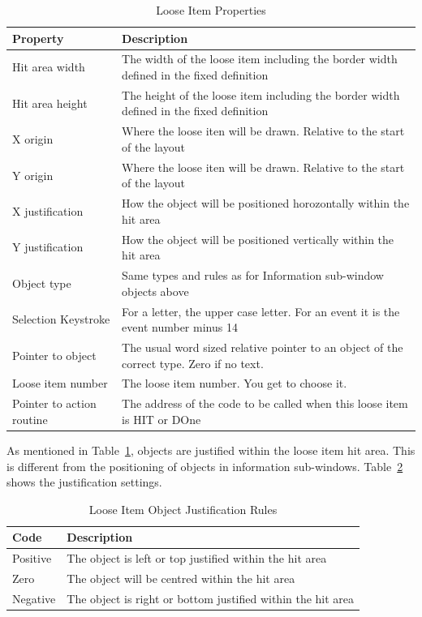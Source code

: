\begin{table}[htbp]
\centering
\begin{tabular}{p{} p{}}
\toprule
\textbf{Property} & \textbf{Description} \\
\midrule
%
Hit area width            & The width of the loose item including the border width defined in the fixed definition \\
Hit area height           & The height of the loose item including the border width defined in the fixed definition \\
X origin                  & Where the loose iten will be drawn. Relative to the start of the layout \\
Y origin                  & Where the loose iten will be drawn. Relative to the start of the layout \\
X justification           & How the object will be positioned horozontally within the hit area \\
Y justification           & How the object will be positioned vertically within the hit area \\
Object type               & Same types and rules as for Information sub-window objects above \\
Selection Keystroke       & For a letter, the upper case letter. For an event it is the event number minus 14 \\
Pointer to object         & The usual word sized relative pointer to an object of the correct type. Zero if no text. \\
Loose item number         & The loose item number. You get to choose it. \\
Pointer to action routine & The address of the code to be called when this loose item is HIT or DOne \\
%
\bottomrule
\end{tabular}
\caption{Loose Item Properties}
\label{tab:LooseItemProperties}
\end{table}

As mentioned in Table~\ref{tab:LooseItemProperties}, objects are justified within the loose item hit
area. This is different from the positioning of objects in information sub-{}windows. Table~\ref{tab:LooseItemObjectJustificationRules} shows the justification settings.

\begin{table}[htbp]
\centering
\begin{tabular}{l p{}}
\toprule
\textbf{Code} & \textbf{Description} \\
\midrule
%
Positive & The object is left or top justified within the hit area \\
Zero     & The object will be centred within the hit area \\
Negative & The object is right or bottom justified within the hit area \\
%
\bottomrule
\end{tabular}
\caption{Loose Item Object Justification Rules}
\label{tab:LooseItemObjectJustificationRules}
\end{table}


